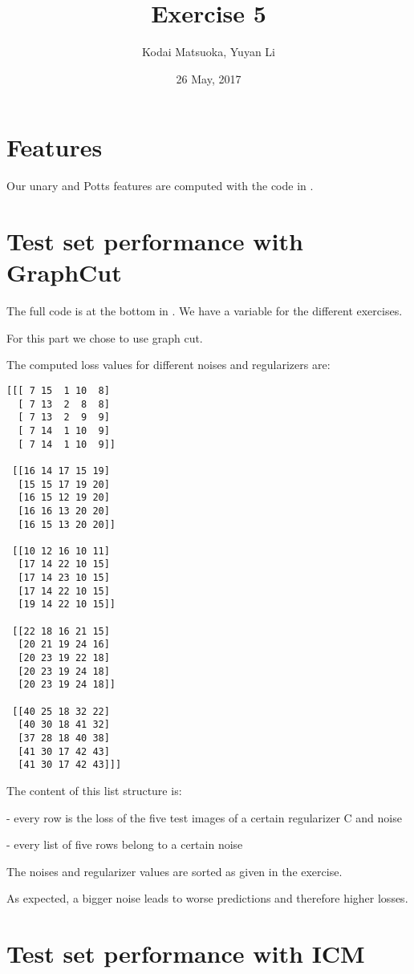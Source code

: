 \documentclass[12pt]{scrartcl}
\author{Kodai Matsuoka, Yuyan Li}
\title{Exercise 5}
\date{26 May, 2017}
\begin{document}
\maketitle

\section{Features}

Our unary and Potts features are computed with the code in .



\section{Test set performance with GraphCut}
The full code is at the bottom in . We have a variable  for the different exercises.

For this part we chose  to use graph cut.

The computed loss values for different noises and regularizers are:

\begin{verbatim}
[[[ 7 15  1 10  8]
  [ 7 13  2  8  8]
  [ 7 13  2  9  9]
  [ 7 14  1 10  9]
  [ 7 14  1 10  9]]

 [[16 14 17 15 19]
  [15 15 17 19 20]
  [16 15 12 19 20]
  [16 16 13 20 20]
  [16 15 13 20 20]]

 [[10 12 16 10 11]
  [17 14 22 10 15]
  [17 14 23 10 15]
  [17 14 22 10 15]
  [19 14 22 10 15]]

 [[22 18 16 21 15]
  [20 21 19 24 16]
  [20 23 19 22 18]
  [20 23 19 24 18]
  [20 23 19 24 18]]

 [[40 25 18 32 22]
  [40 30 18 41 32]
  [37 28 18 40 38]
  [41 30 17 42 43]
  [41 30 17 42 43]]]
\end{verbatim}

The content of this list structure is:

- every row is the loss of the five test images of a certain regularizer C and noise

- every list of five rows belong to a certain noise

The noises and regularizer values are sorted as given in the exercise.

As expected, a bigger noise leads to worse predictions and therefore higher losses.

\section{Test set performance with ICM}
\end{document}
